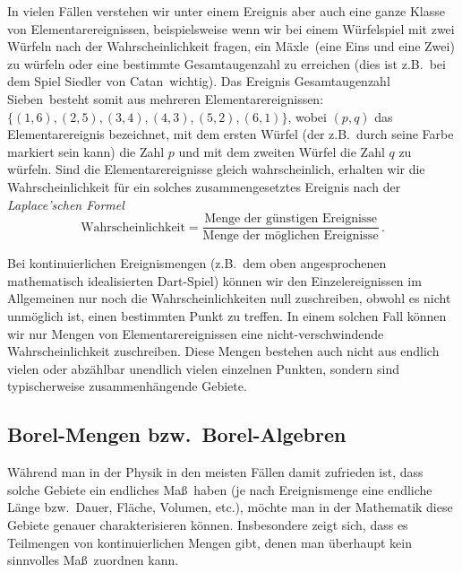 In vielen F\"allen verstehen wir unter einem
Ereignis aber auch eine ganze Klasse von
Elementarereignissen, beispielsweise wenn
wir bei einem W\"urfelspiel mit zwei W\"urfeln 
nach der Wahrscheinlichkeit fragen, ein
\glqq M\"axle\grqq\ (eine Eins und eine Zwei)
zu w\"urfeln oder eine bestimmte Gesamtaugenzahl
zu erreichen (dies ist
z.B.\ bei dem Spiel \glqq Siedler von Catan\grqq\
wichtig). Das Ereignis \glqq Gesamtaugenzahl
Sieben\grqq\ besteht somit aus mehreren
Elementarereignissen: 
$\{(1,6),(2,5),(3,4),(4,3),(5,2),(6,1)\}$, wobei $(p,q)$
das Elementarereignis bezeichnet, mit dem ersten
W\"urfel (der z.B.\ durch seine Farbe markiert sein
kann) die Zahl $p$ und mit dem zweiten W\"urfel
die Zahl $q$ zu w\"urfeln. Sind die Elementarereignisse
gleich wahrscheinlich, erhalten wir die Wahrscheinlichkeit
f\"ur ein solches zusammengesetztes Ereignis nach der 
\textit{Laplace'schen Formel}
\begin{equation}
   \mbox{Wahrscheinlichkeit} = 
   \frac{\mbox{Menge der g\"unstigen Ereignisse}}{\mbox{Menge
   der m\"oglichen Ereignisse}} \, .
\end{equation}

Bei kontinuierlichen Ereignismengen (z.B.\ dem
oben angesprochenen mathematisch idealisierten
Dart-Spiel) k\"onnen wir den Einzelereignissen
im Allgemeinen nur noch die Wahrscheinlichkeiten 
null zuschreiben, obwohl es nicht unm\"oglich 
ist, einen bestimmten Punkt zu treffen.
In einem solchen Fall k\"onnen wir nur 
Mengen von Elementarereignissen eine
nicht-verschwindende
Wahrscheinlichkeit zuschreiben. Diese Mengen
bestehen auch nicht aus endlich vielen oder abz\"ahlbar
unendlich vielen einzelnen Punkten, sondern
sind typischerweise zusammenh\"angende Gebiete.

\subsection{Borel-Mengen bzw.\ Borel-Algebren}

W\"ahrend man in der Physik in den meisten F\"allen
damit zufrieden ist, dass solche Gebiete ein
endliches Ma\ss\ haben (je nach Ereignismenge
eine endliche L\"ange bzw.\ Dauer, Fl\"ache, Volumen, 
etc.), m\"ochte man in der Mathematik diese Gebiete
genauer charakterisieren k\"onnen. Insbesondere
zeigt sich, dass es Teilmengen von kontinuierlichen
Mengen gibt, denen man \"uberhaupt kein sinnvolles
Ma\ss\ zuordnen kann. 

